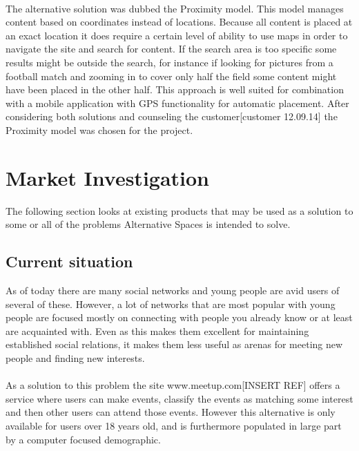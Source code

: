 \paragraph{} The alternative solution was dubbed the Proximity model. This model manages content based on coordinates instead of locations. Because all content is placed at an exact location it does require a certain level of ability to use maps in order to navigate the site and search for content. If the search area is too specific some results might be outside the search, for instance if looking for pictures from a football match and zooming in to cover only half the field some content might have been placed in the other half. This approach is well suited for combination with a mobile application with GPS functionality for automatic placement. After considering both solutions and counseling the customer[customer 12.09.14] the Proximity model was chosen for the project.

\section{Market Investigation}
\label{sec:PrelimMarket}

The following section looks at existing products that may be used as a solution to some or all of the problems Alternative Spaces is intended to solve.

\subsection{Current situation}
\label{subsec:PrelimMarketSituation}
As of today there are many social networks and young people are avid users of several of these. However, a lot of networks that are most popular with young people are focused mostly on connecting with people you already know or at least are acquainted with. Even as this makes them excellent for maintaining established social relations, it makes them less useful as arenas for meeting new people and finding new interests.

\paragraph{} As a solution to this problem the site www.meetup.com[INSERT REF] offers a service where users can make events, classify the events as matching some interest and then other users can attend those events. However this alternative is only available for users over 18 years old, and is furthermore populated in large part by a computer focused demographic.

